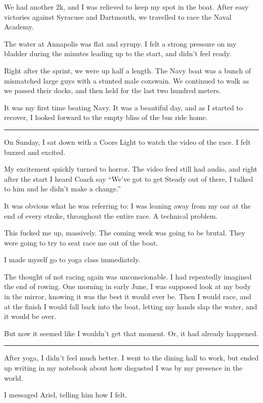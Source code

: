 We had another 2k, and I was relieved to keep my spot in the boat.  After easy
victories against Syracuse and Dartmouth, we travelled to race the Naval
Academy.

The water at Annapolis was flat and syrupy.  I felt a strong pressure on my
bladder during the minutes leading up to the start, and didn't feel ready.

Right after the sprint, we were up half a length.  The Navy boat was a bunch of
mismatched large guys with a stunted male coxswain.  We continued to walk as we
passed their docks, and then held for the last two hundred meters.

It was my first time beating Navy.  It was a beautiful day, and as I started to
recover, I looked forward to the empty bliss of the bus ride home.

\plainfancybreak{12pt}{2}{}

On Sunday, I sat down with a Coors Light to watch the video of the race.  I felt
buzzed and excited.

My excitement quickly turned to horror.  The video feed still had audio, and
right after the start I heard Coach say ``We've got to get Steady out of there,
I talked to him and he didn't make a change.''

It was obvious what he was referring to: I was leaning away from my oar at the
end of every stroke, throughout the entire race.  A technical problem.

This fucked me up, massively.  The coming week was going to be brutal.  They
were going to try to seat race me out of the boat.

I made myself go to yoga class immediately.

The thought of not racing again was unconscionable.  I had repeatedly imagined
the end of rowing.  One morning in early June, I was supposed look at my body in
the mirror, knowing it was the best it would ever be.  Then I would race, and at
the finish I would fall back into the boat, letting my hands slap the water, and
it would be over.

But now it seemed like I wouldn't get that moment.  Or, it had already happened.

\plainfancybreak{12pt}{2}{}

After yoga, I didn't feel much better.  I went to the dining hall to work, but
ended up writing in my notebook about how disgusted I was by my presence in the
world.

I messaged Ariel, telling him how I felt.

